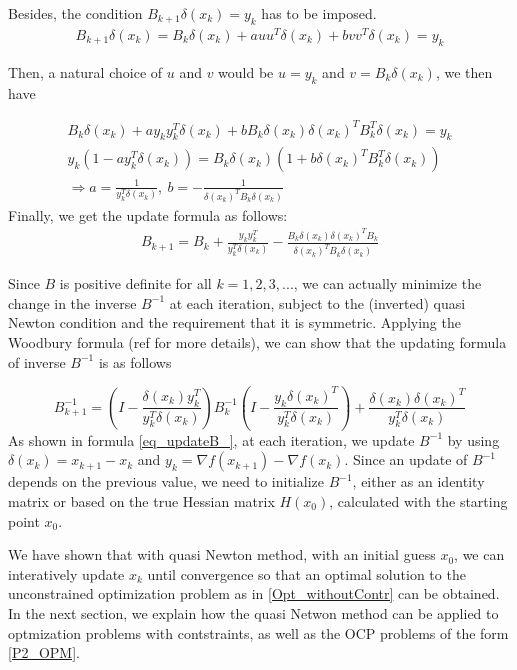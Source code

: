 \documentclass  [
  paper    = a4,
  BCOR     = 10mm,
  twoside,
  fontsize = 12pt,
  fleqn,
  toc      = bibnumbered,
  toc      = listofnumbered,
  numbers  = noendperiod,
  headings = normal,
  listof   = leveldown,
  version  = 3.03
]                                       {scrreprt}
\newcommand{\<}{\langle}
\renewcommand{\>}{\rangle}
\begin{document}
Besides, the condition $B_{k+1}\delta(x_k) = y_k$ has to be imposed.
\begin{align*}
	B_{k+1}\delta(x_k) = B_k\delta(x_k)  + a u u^T\delta(x_k) + b v v^T\delta(x_k) = y_k
\end{align*}

Then, a natural choice of $u$ and $v$ would be $u=y_k$ and $v=B_k\delta(x_k)$, we then have

\begin{align*}
	B_k\delta(x_k) + a y_ky^T_k\delta(x_k) + bB_k\delta(x_k) \delta(x_k)^TB_k^T\delta(x_k) = y_k  \\
	y_k(1-ay_k^T\delta(x_k) ) = B_k\delta(x_k)(1+ b \delta(x_k)^TB_k^T\delta(x_k)) \\
	\Rightarrow a = \frac{1}{y_k^T\delta(x_k)}, \  b= - \frac{1}{\delta(x_k)^TB_k\delta(x_k)}
\end{align*}
Finally, we get the update formula as follows: 
\begin{align*}
	B_{k+1} = B_k +  \frac{y_ky_k^T}{y_k^T\delta(x_k)}  - \frac{B_k\delta(x_k)\delta(x_k)^TB_k}{\delta(x_k)^TB_k\delta(x_k)}
\end{align*}

Since $B$ is positive definite for all $k = 1,2, 3, ...$, we can actually minimize the change in the inverse $B^{-1}$ at each iteration, subject to the (inverted) quasi Newton condition and the requirement that it is symmetric. Applying the Woodbury formula (ref \cite{Wood50} for more details), we can show that the updating formula of inverse $B^{-1}$ is as follows

\begin{equation}
	B_{k+1}^{-1} = (I - \frac{\delta(x_k)y_k^T}{y_k^T\delta(x_k)})B_k^{-1}(I - \frac{y_k\delta(x_k)^T}{y_k^T\delta(x_k)}) +  \frac{\delta(x_k)\delta(x_k)^T}{y_k^T\delta(x_k)} 
	\label{eq_updateB_}
\end{equation}
As shown in formula \ref{eq_updateB_}, at each iteration, we update $B^{-1}$ by using  $\delta(x_k) = x_{k+1} -x_k$ and $y_k = \nabla f(x_{k+1}) - \nabla f(x_k)$. Since an update of $B^{-1}$ depends on the previous value, we need to initialize $B^{-1}$, either as an identity matrix or based on the true Hessian matrix $H(x_0)$, calculated with the starting point $x_0$.


We have shown that with quasi Newton method, with an initial guess $x_0$,  we can interatively update $x_k$ until convergence so that an optimal solution to the unconstrained optimization problem as in \ref{Opt_withoutContr} can be obtained. In the next section, we explain how the quasi Netwon method can be applied to optmization problems with contstraints, as well as the OCP problems of the form \ref{P2_OPM}.
\end{document}
